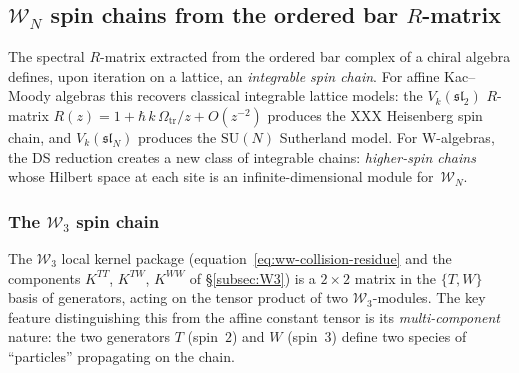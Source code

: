 
\subsection{$\mathcal{W}_N$ spin chains from the ordered bar
$R$-matrix}
\label{subsec:wn-spin-chains}

The spectral $R$-matrix extracted from the ordered bar complex
of a chiral algebra defines, upon iteration on a lattice, an
\emph{integrable spin chain}. For affine Kac--Moody algebras
this recovers classical integrable lattice models: the
$V_k(\mathfrak{sl}_2)$ $R$-matrix $R(z) = 1 + \hbar\,k\,\Omega_{\mathrm{tr}}/z
+ O(z^{-2})$ produces the XXX Heisenberg spin chain, and
$V_k(\mathfrak{sl}_N)$ produces the $\mathrm{SU}(N)$ Sutherland
model. For W-algebras, the DS reduction creates a new
class of integrable chains: \emph{higher-spin chains} whose
Hilbert space at each site is an infinite-dimensional module
for~$\mathcal{W}_N$.

\subsubsection{The $\mathcal{W}_3$ spin chain}

The $\mathcal{W}_3$ local kernel package
(equation~\eqref{eq:ww-collision-residue} and the
components $K^{TT}$, $K^{TW}$, $K^{WW}$ of
\S\ref{subsec:W3}) is a $2 \times 2$ matrix in the
$\{T, W\}$ basis of generators, acting on the tensor product
of two $\mathcal{W}_3$-modules. The key feature distinguishing
this from the affine constant tensor is its \emph{multi-component}
nature: the two generators $T$ (spin~$2$) and $W$ (spin~$3$)
define two species of ``particles'' propagating on the chain.

